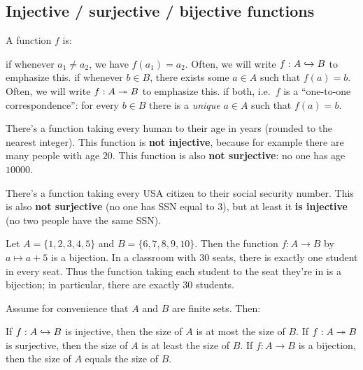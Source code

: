 \subsection{Injective / surjective / bijective functions}
\begin{definition}
	A function $f$ is:
	\begin{itemize}
		\ii {} if whenever $a_1 \neq a_2$, we have $f(a_1) = a_2$.
		Often, we will write $f : A \hookrightarrow B$ to emphasize this.
		\ii {} if whenever $b \in B$, there exists some $a \in A$
		such that $f(a) = b$.
		Often, we will write $f : A \twoheadrightarrow B$ to emphasize this.
		\ii {} if both, i.e.\ $f$ is a ``one-to-one correspondence'':
		for every $b \in B$ there is a \emph{unique} $a \in A$
		such that $f(a) = b$.
	\end{itemize}
\end{definition}

\begin{example}
	\listhack
	\begin{enumerate}[(a)]
		\ii There's a function taking every human to their
		age in years (rounded to the nearest integer).
		This function is \textbf{not injective},
		because for example there are many people with age $20$.
		This function is also \textbf{not surjective}: no one has age $10000$.

		\ii There's a function taking every
		USA citizen to their social security number.
		This is also \textbf{not surjective} (no one has SSN equal to $3$),
		but at least it \textbf{is injective} (no two people have the same SSN).
	\end{enumerate}
\end{example}

\begin{example}
	\listhack
	\begin{enumerate}[(a)]
		\ii Let $A = \{1,2,3,4,5\}$ and $B = \{6,7,8,9,10\}$.
		Then the function $f : A \to B$ by $a \mapsto a+5$ is a bijection.
		\ii In a classroom with $30$ seats,
		there is exactly one student in every seat.
		Thus the function taking each student to the seat they're in
		is a bijection; in particular, there are exactly $30$ students.
	\end{enumerate}
\end{example}

\begin{remark}
	Assume for convenience that $A$ and $B$ are finite sets. Then:
	\begin{itemize}
		\ii If $f : A \hookrightarrow B$ is injective, then the size of $A$ is at most the size of $B$.
		\ii If $f : A \twoheadrightarrow B$ is surjective, then the size of $A$ is at least the size of $B$.
		\ii If $f : A \to B$ is a bijection, then the size of $A$ equals the size of $B$.
	\end{itemize}
\end{remark}

